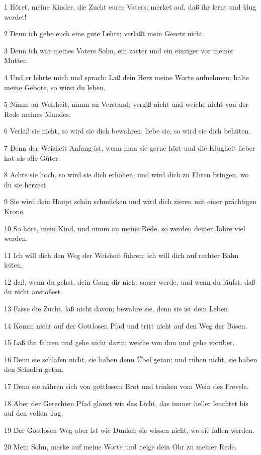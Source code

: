 \par 1 Höret, meine Kinder, die Zucht eures Vaters; merket auf, daß ihr lernt und klug werdet!
\par 2 Denn ich gebe euch eine gute Lehre; verlaßt mein Gesetz nicht.
\par 3 Denn ich war meines Vaters Sohn, ein zarter und ein einziger vor meiner Mutter.
\par 4 Und er lehrte mich und sprach: Laß dein Herz meine Worte aufnehmen; halte meine Gebote, so wirst du leben.
\par 5 Nimm an Weisheit, nimm an Verstand; vergiß nicht und weiche nicht von der Rede meines Mundes.
\par 6 Verlaß sie nicht, so wird sie dich bewahren; liebe sie, so wird sie dich behüten.
\par 7 Denn der Weisheit Anfang ist, wenn man sie gerne hört und die Klugheit lieber hat als alle Güter.
\par 8 Achte sie hoch, so wird sie dich erhöhen, und wird dich zu Ehren bringen, wo du sie herzest.
\par 9 Sie wird dein Haupt schön schmücken und wird dich zieren mit einer prächtigen Krone.
\par 10 So höre, mein Kind, und nimm an meine Rede, so werden deiner Jahre viel werden.
\par 11 Ich will dich den Weg der Weisheit führen; ich will dich auf rechter Bahn leiten,
\par 12 daß, wenn du gehst, dein Gang dir nicht sauer werde, und wenn du läufst, daß du nicht anstoßest.
\par 13 Fasse die Zucht, laß nicht davon; bewahre sie, denn sie ist dein Leben.
\par 14 Komm nicht auf der Gottlosen Pfad und tritt nicht auf den Weg der Bösen.
\par 15 Laß ihn fahren und gehe nicht darin; weiche von ihm und gehe vorüber.
\par 16 Denn sie schlafen nicht, sie haben denn Übel getan; und ruhen nicht, sie haben den Schaden getan.
\par 17 Denn sie nähren sich von gottlosem Brot und trinken vom Wein des Frevels.
\par 18 Aber der Gerechten Pfad glänzt wie das Licht, das immer heller leuchtet bis auf den vollen Tag.
\par 19 Der Gottlosen Weg aber ist wie Dunkel; sie wissen nicht, wo sie fallen werden.
\par 20 Mein Sohn, merke auf meine Worte und neige dein Ohr zu meiner Rede.
